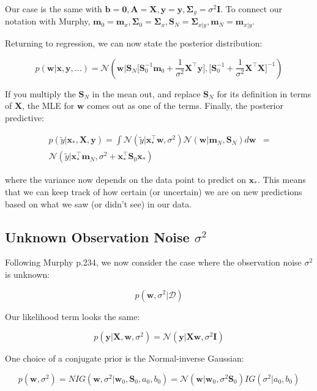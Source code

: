 \documentclass{harvardml}
\theoremstyle{definition}
\theoremstyle{plain}
\renewcommand{\v}[1]{\mathbf{#1}}
\begin{document}
\noindent Our case is the same with $\v b = \v 0, \v A = \v X, \v y = \v y, 
\v \Sigma_y = \sigma^2 \v I$. To connect our notation with Murphy, 
$\v m_0 = \v m_x, \v \Sigma_0 = \v \Sigma_{x}, 
\v S_N = \v \Sigma_{x|y}, \v m_N = \v m_{x|y}$.

\newpage

\noindent Returning to regression, we can now state the posterior distribution:

$$ p(\v w | \v x, \v y, ...) = 
    \mathcal{N}(\v w | \v S_N 
    \big[\v S_0^{-1} \v m_0 + \frac{1}{\sigma^2} \v X^\top \v y \big],
    \big[ \v S_0^{-1} + \frac{1}{\sigma^2}\v X^\top \v X\big]^{-1})$$

\noindent If you multiply the $\v S_N$ in the mean out, 
and replace $\v S_N$ for its definition in terms of $\v X$, 
the MLE for $\v w$ comes out as one of the terms.
Finally, the posterior predictive:

\begin{align*}
    p(\tilde{y} | \v x_{*}, \v X ,\v y) = \int 
    \mathcal{N}(\tilde{y}|\v x_{*}^\top \v w, \sigma^2)
    \mathcal{N}(\v w | \v m_N, \v S_N) d \v w &= \\
    \mathcal{N}(\tilde{y} | \v x_{*}^\top \v m_N, 
                \sigma^2 + \v x_{*}^\top \v S_0 \v x_{*})
\end{align*}

\noindent where the variance now depends on the data point to predict on 
$\v x_{*}$. This means that we can keep track of how certain (or uncertain) 
we are on new predictions based on what we saw (or didn't see) in our data.

\subsection{Unknown Observation Noise $\sigma^2$}
Following Murphy p.234, we now consider the case where the observation noise 
$\sigma^2$ is unknown:

$$ p(\v w, \sigma^2 | \mathcal{D}) $$

\noindent Our likelihood term looks the same:

$$ p( \v y | \v X, \v w, \sigma^2) = 
   \mathcal{N}(\v y | \v X \v w, \sigma^2 \v I) $$

\noindent One choice of a conjugate prior is the Normal-inverse Gaussian:

$$ p(\v w, \sigma^2) = NIG(\v w, \sigma^2 | \v w_0, \v S_0, a_0, b_0)
   = \mathcal{N}(\v w | \v w_0, \sigma^2 \v S_0) IG(\sigma^2|a_0,b_0)$$
\end{document}
